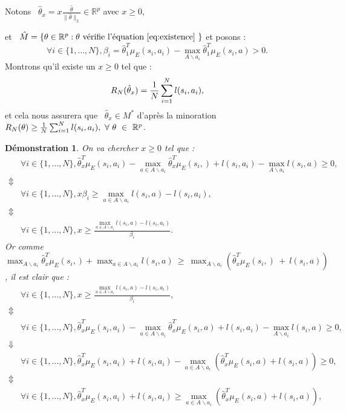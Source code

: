 \documentclass[publibook-draft]{CAp2012}
\newtheorem{preuve}{Démonstration}
\begin{document}
Notons ~$\hat{\theta}_x=x\frac{\hat{\theta}}{\|\hat{\theta}\|_2}\in\mathbb{R}^p$ avec $x\geq0$,{ et ~$\hat{M}=\{\theta\in\mathbb{R}^p:\theta \text{ vérifie l'équation \ref{eq:existence} }  \}$ et posons :
\begin{equation}
\forall i\in\{1,\dots,N\}, \beta_i=\hat{\theta}_1^T\mu_E(s_i,a_i)-\max_{A \backslash a_i}\hat{\theta}_1^T\mu_E(s_i,a)>0.
\end{equation}
Montrons qu'il existe un $x\geq0$ tel que :
\begin{equation}
R_N(\hat{\theta}_x)= {1\over N} \sum_{i=1}^N l(s_i,a_i),
\end{equation}
et cela nous assurera que ~$\hat{\theta}_x\in M^*$ d'après la minoration ~$R_N(\theta)\geq {1\over N} \sum_{i=1}^Nl(s_i,a_i),~\forall~\theta~\in~\mathbb{R}^p$.
\begin{preuve}
On va chercher $x\geq0$ tel que :
\begin{align}
&\forall i\in\{1,\dots,N\}, \hat{\theta}_x^T\mu_E(s_i,a_i)-\max_{a\in A \backslash a_i}\hat{\theta}_x^T\mu_E(s_i,) + l(s_i,a_i)-\max_{A \backslash a_i}l(s_i,a)\geq0,
\\
\nonumber\Updownarrow
\\
&\forall i\in\{1,\dots,N\}, x\beta_i \geq\max_{a\in A \backslash a_i}l(s_i,a)-l(s_i,a_i),
\\
\nonumber\Updownarrow
\\
&\forall i\in\{1,\dots,N\}, x\geq\frac{\max_{a\in A \backslash a_i}l(s_i,a)-l(s_i,a_i)}{\beta_i}.
\end{align}
Or comme ~$\max_{A \backslash a_i}\hat{\theta}_x^T\mu_E(s_i,)+\max_{a\in A \backslash a_i}l(s_i,a)~\geq~\max_{A \backslash a_i}(\hat{\theta}_x^T\mu_E(s_i,)~+~l(s_i,a))$, il est clair que :
\begin{align}
&\forall i\in\{1,\dots,N\}, x\geq\frac{\max_{a\in A \backslash a_i}l(s_i,a)-l(s_i,a_i)}{\beta_i},
\\
\nonumber\Updownarrow
\\
&\forall i\in\{1,\dots,N\}, \hat{\theta}_x^T\mu_E(s_i,a_i)-\max_{a \in A \backslash a_i}\hat{\theta}_x^T\mu_E(s_i,a) + l(s_i,a_i)-\max_{A \backslash a_i}l(s_i,a)\geq0,
\\
\nonumber\Downarrow
\\
&\forall i\in\{1,\dots,N\}, \hat{\theta}_x^T\mu_E(s_i,a_i) + l(s_i,a_i)-\max_{a \in A  \backslash a_i}(\hat{\theta}_x^T\mu_E(s_i,a)+l(s_i,a))\geq0,
\\
\nonumber\Updownarrow
\\
&\forall i\in\{1,\dots,N\}, \hat{\theta}_x^T\mu_E(s_i,a_i) + l(s_i,a_i)\geq\max_{a \in A \backslash a_i}(\hat{\theta}_x^T\mu_E(s_i,a)+l(s_i,a)),

\end{align}
\end{preuve}}
\end{document}
